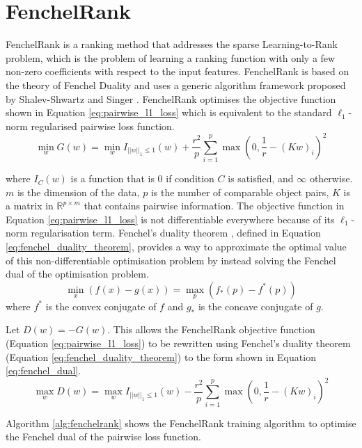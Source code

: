 \section{FenchelRank}
FenchelRank \cite{Lai2013} is a ranking method that addresses the sparse Learning-to-Rank problem, which is the problem of learning a ranking function with only a few non-zero coefficients with respect to the input features. FenchelRank is based on the theory of Fenchel Duality \cite{Rifkin2007} and uses a generic algorithm framework proposed by Shalev-Shwartz and Singer \cite{Shalev-Shwartz2010}. FenchelRank optimises the objective function shown in Equation \ref{eq:pairwise_l1_loss} which is equivalent to the standard $\ell_1$-norm regularised pairwise loss function.
\begin{equation}
\min_w G(w) = \min_w I_{||w||_{1} \le 1}(w) + \frac{r^2}{p} \sum\limits_{i=1}^{p}\max(0,\frac{1}{r}-(Kw)_i)^2
\label{eq:pairwise_l1_loss}
\end{equation}

\noindent where $I_{C}(w)$ is a function that is 0 if condition $C$ is satisfied, and $\infty$ otherwise. $m$ is the dimension of the data, $p$ is the number of comparable object pairs, $K$ is a matrix in $\mathbb{R}^{p \times m}$ that contains pairwise information. The objective function in Equation \ref{eq:pairwise_l1_loss} is not differentiable everywhere because of its $\ell_1$-norm regularisation term. Fenchel's duality theorem \cite{Rifkin2007}, defined in Equation \ref{eq:fenchel_duality_theorem}, provides a way to approximate the optimal value of this non-differentiable optimisation problem by instead solving the Fenchel dual of the optimisation problem.
\begin{equation}
\min_x(f(x)-g(x)) = \max_p(f_*(p)-f^*(p))
\label{eq:fenchel_duality_theorem}
\end{equation}
\noindent where $f^*$ is the convex conjugate of $f$ and $g_*$ is the concave conjugate of $g$.

\noindent Let $D(w) = -G(w)$. This allows the FenchelRank objective function (Equation \ref{eq:pairwise_l1_loss}) to be rewritten using Fenchel's duality theorem (Equation \ref{eq:fenchel_duality_theorem}) to the form shown in Equation \ref{eq:fenchel_dual}.
\begin{equation}
\max_w D(w) = \max_w I_{||w||_{1} \le 1}(w) - \frac{r^2}{p} \sum\limits_{i=1}^{p}\max(0,\frac{1}{r}-(Kw)_i)^2
\label{eq:fenchel_dual}
\end{equation}

Algorithm \ref{alg:fenchelrank} shows the FenchelRank training algorithm to optimise the Fenchel dual of the pairwise loss function.\\

